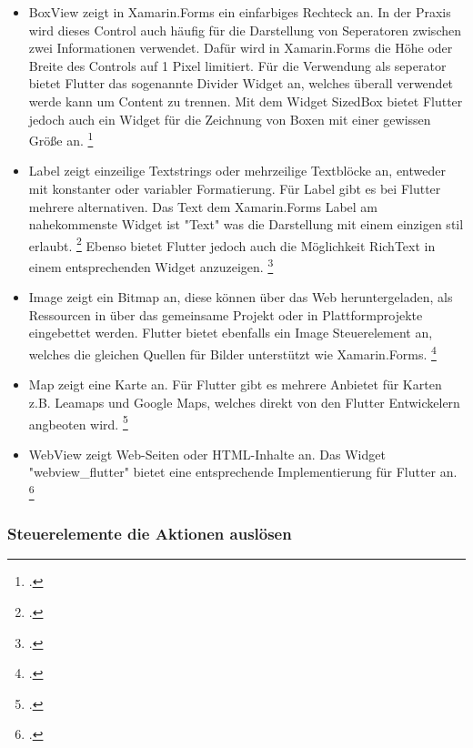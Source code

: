\begin{itemize}
\setlength\itemsep{-0.6em}
 \item BoxView zeigt in Xamarin.Forms ein einfarbiges Rechteck an. In der Praxis wird dieses Control auch häufig für die Darstellung von Seperatoren zwischen zwei Informationen verwendet.  Dafür wird in Xamarin.Forms die Höhe oder Breite des Controls auf 1 Pixel limitiert.  Für die Verwendung als seperator bietet Flutter das sogenannte Divider Widget an, welches überall verwendet werde kann um Content zu trennen.  Mit dem Widget SizedBox bietet Flutter jedoch auch ein Widget für die Zeichnung von Boxen mit einer gewissen Größe an.  \footcite[Vgl.][Abgerufen am \today]{GoogleFlutterSizedBox2020}
 \item Label zeigt einzeilige Textstrings oder mehrzeilige Textblöcke an, entweder mit konstanter oder variabler Formatierung. Für Label gibt es bei Flutter mehrere alternativen.  Das Text dem Xamarin.Forms Label am nahekommenste Widget ist "Text" was die Darstellung mit einem einzigen stil erlaubt. \footcite[Vgl.][Abgerufen am \today]{GoogleFlutterText2020} Ebenso bietet Flutter jedoch auch die Möglichkeit RichText in einem entsprechenden Widget anzuzeigen. \footcite[Vgl.][Abgerufen am \today]{GoogleFlutterRichText2020}
 \item Image zeigt ein Bitmap an, diese können über das Web heruntergeladen, als Ressourcen in über das gemeinsame Projekt oder in Plattformprojekte eingebettet  werden.  Flutter bietet ebenfalls ein Image Steuerelement an, welches die gleichen Quellen für Bilder unterstützt wie Xamarin.Forms. \footcite[Vgl.][Abgerufen am \today]{GoogleFlutterImage2020}
 \item Map zeigt eine Karte an.  Für Flutter gibt es mehrere Anbietet für Karten z.B. Leamaps und Google Maps, welches direkt von den Flutter Entwickelern angbeoten wird. \footcite[Vgl.][Abgerufen am \today]{GoogleFlutterMap2020}
 \item WebView zeigt Web-Seiten oder HTML-Inhalte an.  Das Widget "webview\_flutter" bietet eine entsprechende Implementierung für Flutter an. \footcite[Vgl.][Abgerufen am \today]{GoogleFlutterWebView2020}
\end{itemize}

\subsubsection{Steuerelemente die Aktionen auslösen}

